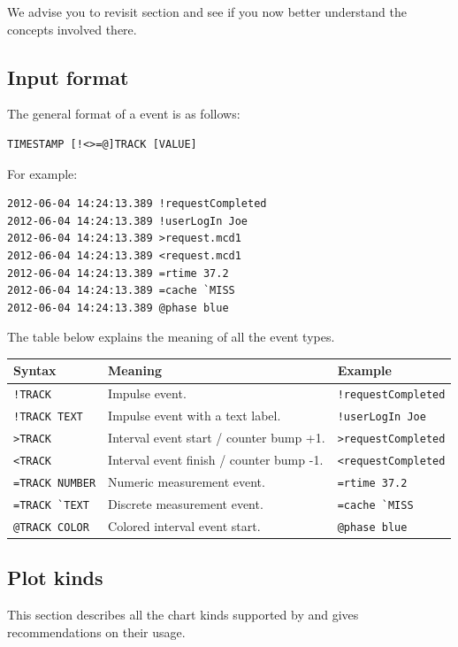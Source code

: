 \documentclass{article}
\begin{document}
We advise you to revisit section  and see if you now better understand the concepts involved there.

\pagebreak
\subsection{Input format}
\label{sec:tplot-input-format}

The general format of a \timeplot{} event is as follows:
\begin{verbatim}
TIMESTAMP [!<>=@]TRACK [VALUE]
\end{verbatim}

For example:
\begin{verbatim}
2012-06-04 14:24:13.389 !requestCompleted
2012-06-04 14:24:13.389 !userLogIn Joe
2012-06-04 14:24:13.389 >request.mcd1
2012-06-04 14:24:13.389 <request.mcd1
2012-06-04 14:24:13.389 =rtime 37.2
2012-06-04 14:24:13.389 =cache `MISS
2012-06-04 14:24:13.389 @phase blue
\end{verbatim}

The table below explains the meaning of all the event types.

\begin{tabular}{|l|p{200px}|l|}
\hline
Syntax & Meaning & Example \\
\hline
\verb|!TRACK| & Impulse event. & \verb|!requestCompleted| \\
\hline
\verb|!TRACK TEXT| & Impulse event with a text label. & \verb|!userLogIn Joe| \\
\hline
\verb|>TRACK| & Interval event start / counter bump +1. & \verb|>requestCompleted| \\
\hline
\verb|<TRACK| & Interval event finish / counter bump -1. & \verb|<requestCompleted| \\
\hline
\verb|=TRACK NUMBER| & Numeric measurement event. & \verb|=rtime 37.2| \\
\hline
\verb|=TRACK `TEXT| & Discrete measurement event. & \verb|=cache `MISS| \\
\hline
\verb|@TRACK COLOR| & Colored interval event start. & \verb|@phase blue| \\
\hline
\end{tabular}

\pagebreak
\subsection{Plot kinds}
\label{sec:tplot-plot-kinds}
This section describes all the chart kinds supported by \timeplot{} and gives recommendations on their usage.
\end{document}
